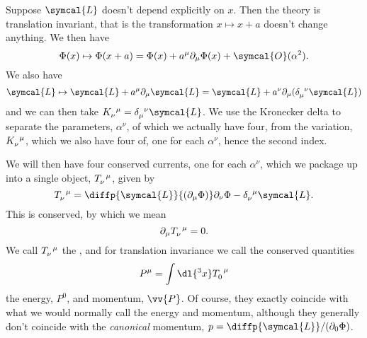 \documentclass[fleqn]{NotesClass}
\newcommand{\order}{\symcal{O}}
\newcommand{\lagrangianDensity}{\symcal{L}}
\begin{document}
    \begin{exm}{}{}
        Suppose \(\lagrangianDensity\) doesn't depend explicitly on \(x\).
        Then the theory is translation invariant, that is the transformation \(x \mapsto x + a\) doesn't change anything.
        We then have
        \begin{equation}
            \Phi(x) \mapsto \Phi(x + a) = \Phi(x) + a^\mu \partial_\mu \Phi(x) + \order(\alpha^2).
        \end{equation}
        We also have
        \begin{equation}
            \lagrangianDensity \mapsto \lagrangianDensity + a^\mu \partial_\mu \lagrangianDensity = \lagrangianDensity + a^\nu \partial_\mu (\tensor{\delta}{_\mu^\nu}\lagrangianDensity)
        \end{equation}
        and we can then take \(\tensor{K}{_\nu^\mu} = \tensor{\delta}{_\mu^\nu} \lagrangianDensity\).
        We use the Kronecker delta to separate the parameters, \(\alpha^\nu\), of which we actually have four, from the variation, \(\tensor{K}{_\nu^\mu}\), which we also have four of, one for each \(\alpha^\nu\), hence the second index.
        
        We will then have four conserved currents, one for each \(\alpha^\nu\), which we package up into a single object, \(\tensor{T}{_\nu^\mu}\), given by
        \begin{equation}
            \tensor{T}{_\nu^\mu} = \diffp{\lagrangianDensity}{(\partial_\mu \Phi)} \partial_\nu \Phi - \tensor{\delta}{_\nu^\mu} \lagrangianDensity.
        \end{equation}
        This is conserved, by which we mean
        \begin{equation}
            \partial_\mu \tensor{T}{_\nu^\mu} = 0.
        \end{equation}
        We call \(\tensor{T}{_\nu^\mu}\) the , and for translation invariance we call the conserved quantities
        \begin{equation}
            P^\mu = \int \dl{^3x} \tensor{T}{_0^\mu}
        \end{equation}
        the energy, \(P^0\), and momentum, \(\vv{P}\).
        Of course, they exactly coincide with what we would normally call the energy and momentum, although they generally don't coincide with the \emph{canonical} momentum, \(p = \diffp{\lagrangianDensity}/{(\partial_0 \Phi)}\).
    \end{exm}
    
\end{document}
